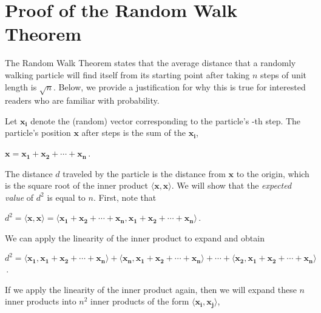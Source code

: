 \chapter[Proof of the Random Walk Theorem]{Proof of the Random Walk Theorem}
\label{chapter:random_walk_theorem}
\renewcommand{\chaptertitle}{Proof of the Random Walk Theorem}

The Random Walk Theorem states that the average distance that a randomly walking particle will find itself from its starting point after taking $n$ steps of unit length is $\sqrt{n}$. Below, we provide a justification for why this is true for interested readers who are familiar with probability.

Let $\mathbf{x_i}$ denote the (random) vector corresponding to the particle's -th step. The particle's position $\mathbf{x}$ after  steps is the sum of the $\mathbf{x_i}$,

\begin{center}
$\mathbf{x} = \mathbf{x_1} + \mathbf{x_2} + \cdots + \mathbf{x_n}$\,.
\end{center}

The distance $d$ traveled by the particle is the distance from $\mathbf{x}$ to the origin, which is the square root of the inner product $\langle \mathbf{x}, \mathbf{x} \rangle$. We will show that the \textit{expected value} of $d^2$ is equal to $n$. First, note that

\begin{center}
$d^2 = \langle \mathbf{x}, \mathbf{x} \rangle = \langle \mathbf{x_1} + \mathbf{x_2} + \cdots + \mathbf{x_n}, \mathbf{x_1} + \mathbf{x_2} + \cdots + \mathbf{x_n} \rangle$\,.
\end{center}

\noindent We can apply the linearity of the inner product to expand and obtain
\begin{center}
$d^2 = \langle \mathbf{x_1}, \mathbf{x_1} + \mathbf{x_2} + \cdots + \mathbf{x_n} \rangle + \langle \mathbf{x_n}, \mathbf{x_1} + \mathbf{x_2} + \cdots + \mathbf{x_n} \rangle + \cdots + \langle \mathbf{x_2}, \mathbf{x_1} + \mathbf{x_2} + \cdots + \mathbf{x_n} \rangle$\,.
\end{center}

\noindent If we apply the linearity of the inner product again, then we will expand these $n$ inner products into $n^2$ inner products of the form $\langle \mathbf{x_i}, \mathbf{x_j} \rangle$,

